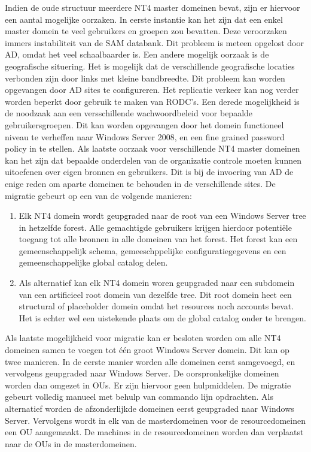 Indien de oude structuur meerdere NT4 master domeinen bevat, zijn er hiervoor
een aantal mogelijke oorzaken. In eerste instantie kan het zijn dat een enkel
master domein te veel gebruikers en groepen zou bevatten. Deze veroorzaken
immers instabiliteit van de SAM databank. Dit probleem is meteen opgelost door
AD, omdat het veel schaalbaarder is. Een andere mogelijk oorzaak is de
geografische situering. Het is mogelijk dat de verschillende geografische
locaties verbonden zijn door links met kleine bandbreedte. Dit probleem kan
worden opgevangen door AD sites te configureren. Het replicatie verkeer kan nog
verder worden beperkt door gebruik te maken van RODC's. Een derede mogelijkheid
is de noodzaak aan een versschillende wachwoordbeleid voor bepaalde
gebruikersgroepen. Dit kan worden opgevangen door het domein functioneel niveau
te verheffen naar Windows Server 2008, en een fine grained password policy in te
stellen. Als laatste oorzaak voor verschillende NT4 master domeinen kan het zijn
dat bepaalde onderdelen van de organizatie controle moeten kunnen uitoefenen
over eigen bronnen en gebruikers. Dit is bij de invoering van AD de enige reden
om aparte domeinen te behouden in de verschillende sites. De migratie gebeurt op
een van de volgende manieren:
\begin{enumerate}
	\item Elk NT4 domein wordt geupgraded naar de root van een Windows
		Server tree in hetzelfde forest. Alle gemachtigde gebruikers
		krijgen hierdoor potentiële toegang tot alle bronnen in alle
		domeinen van het forest. Het forest kan een gemeenschappelijk
		schema, gemeeschppelijke configuratiegegevens en een
		gemeenschappelijke global catalog delen.
	\item Als alternatief kan elk NT4 domein woren geupgraded naar een
		subdomein van een artificieel root domein van dezelfde tree. Dit
		root domein heet een structural of placeholder domein omdat het
		resources noch accounts bevat. Het is echter wel een uistekende
		plaats om de global catalog onder te brengen.
\end{enumerate}

Als laatste mogelijkheid voor migratie kan er besloten worden om alle NT4
domeinen samen te voegen tot één groot Windows Server domein. Dit kan op twee
manieren. In de eerste manier worden alle domeinen eerst samgevoegd, en
vervolgens geupgraded naar Windows Server. De oorspronkelijke domeinen worden
dan omgezet in OUs. Er zijn hiervoor geen hulpmiddelen. De migratie gebeurt
volledig manueel met behulp van commando lijn opdrachten. Als alternatief worden
de afzonderlijkde domeinen eerst geupgraded naar Windows Server. Vervolgens
wordt in elk van de masterdomeinen voor de resourcedomeinen een OU aangemaakt.
De machines in de resourcedomeinen worden dan verplaatst naar de OUs in de
masterdomeinen.
